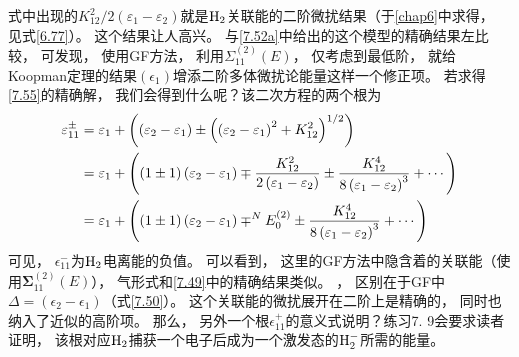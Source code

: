 式中出现的${K_{12}^{2}}/{2\left(\varepsilon_{1}-\varepsilon_{2}\right)}$就是$\mathrm{H}_2$关联能的二阶微扰结果（于\ref{chap6}中求得，
见式\eqref{6.77}）。
这个结果让人高兴。
与\eqref{7.52a}中给出的这个模型的精确结果左比较，
可发现，
使用GF方法，
利用$\Sigma_{11}^{(2)}(E)$，
仅考虑到最低阶，
就给Koopman定理的结果$(\epsilon_1)$增添二阶多体微扰论能量这样一个修正项。
若求得\eqref{7.55}的精确解，
我们会得到什么呢？该二次方程的两个根为
\begin{align}
\varepsilon_{11}^{\pm} &=\varepsilon_{1}+\left(\left(\varepsilon_{2}-\varepsilon_{1}\right) \pm\left(\left(\varepsilon_{2}-\varepsilon_{1}\right)^{2}+K_{12}^{2}\right)^{1 / 2}\right) \notag\\
&=\varepsilon_{1}+\left((1 \pm 1)\left(\varepsilon_{2}-\varepsilon_{1}\right) \mp \frac{K_{12}^{2}}{2\left(\varepsilon_{1}-\varepsilon_{2}\right)} \pm \frac{K_{12}^{4}}{8\left(\varepsilon_{1}-\varepsilon_{2}\right)^{3}}+\cdots\right) \notag\\
	&=\varepsilon_{1}+\left((1 \pm 1)\left(\varepsilon_{2}-\varepsilon_{1}\right) \mp^{N} E_{0}^{(2)} \pm \frac{K_{12}^{4}}{8\left(\varepsilon_{1}-\varepsilon_{2}\right)^{3}}+\cdots\right) \label{7.57}
\end{align}
可见，
$\epsilon_{11}^-$为$\mathrm{H}_2$电离能的负值。
可以看到，
这里的GF方法中隐含着的关联能（使用$\mathbf{\Sigma}_{11}^{(2)}(E)$），
气形式和\eqref{7.49}中的精确结果类似。
，
区别在于GF中$\Delta=(\epsilon_{2}-\epsilon_1)$（式\eqref{7.50}）。
这个关联能的微扰展开在二阶上是精确的，
同时也纳入了近似的高阶项。
那么，
另外一个根$\epsilon_{11}^+$的意义式说明？练习7.
9会要求读者证明，
该根对应$\mathrm{H}_2$捕获一个电子后成为一个激发态的$\mathrm{H}_2^-$所需的能量。


